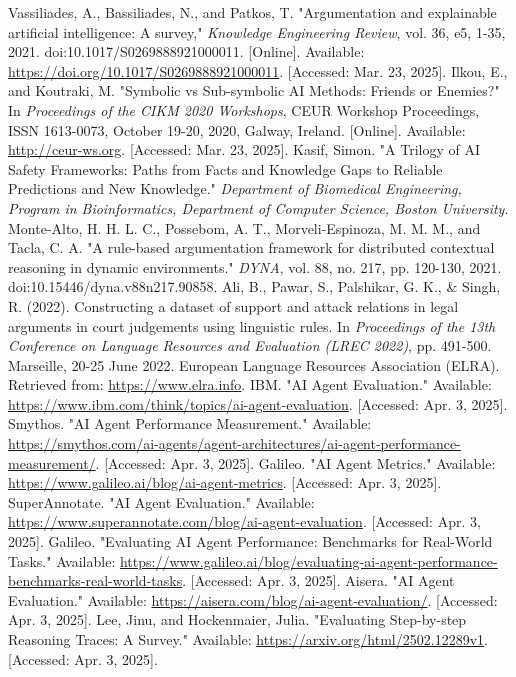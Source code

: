 \documentclass[conference]{IEEEtran}
\begin{document}
\begin{thebibliography}{00}
     Vassiliades, A., Bassiliades, N., and Patkos, T. "Argumentation and explainable artificial intelligence: A survey," \textit{Knowledge Engineering Review}, vol. 36, e5, 1-35, 2021. doi:10.1017/S0269888921000011. [Online]. Available: \url{https://doi.org/10.1017/S0269888921000011}. [Accessed: Mar. 23, 2025].
     Ilkou, E., and Koutraki, M. "Symbolic vs Sub-symbolic AI Methods: Friends or Enemies?" In \textit{Proceedings of the CIKM 2020 Workshops}, CEUR Workshop Proceedings, ISSN 1613-0073, October 19-20, 2020, Galway, Ireland. [Online]. Available: \url{http://ceur-ws.org}. [Accessed: Mar. 23, 2025].
     Kasif, Simon. "A Trilogy of AI Safety Frameworks: Paths from Facts and Knowledge Gaps to Reliable Predictions and New Knowledge." \textit{Department of Biomedical Engineering, Program in Bioinformatics, Department of Computer Science, Boston University}.
     Monte-Alto, H. H. L. C., Possebom, A. T., Morveli-Espinoza, M. M. M., and Tacla, C. A. "A rule-based argumentation framework for distributed contextual reasoning in dynamic environments." \textit{DYNA}, vol. 88, no. 217, pp. 120-130, 2021. doi:10.15446/dyna.v88n217.90858.
     Ali, B., Pawar, S., Palshikar, G. K., \& Singh, R. (2022). Constructing a dataset of support and attack relations in legal arguments in court judgements using linguistic rules. In \textit{Proceedings of the 13th Conference on Language Resources and Evaluation (LREC 2022)}, pp. 491-500. Marseille, 20-25 June 2022. European Language Resources Association (ELRA). Retrieved from: \url{https://www.elra.info}.
     IBM. "AI Agent Evaluation." Available: \url{https://www.ibm.com/think/topics/ai-agent-evaluation}. [Accessed: Apr. 3, 2025].
     Smythos. "AI Agent Performance Measurement." Available: \url{https://smythos.com/ai-agents/agent-architectures/ai-agent-performance-measurement/}. [Accessed: Apr. 3, 2025].
     Galileo. "AI Agent Metrics." Available: \url{https://www.galileo.ai/blog/ai-agent-metrics}. [Accessed: Apr. 3, 2025].
     SuperAnnotate. "AI Agent Evaluation." Available: \url{https://www.superannotate.com/blog/ai-agent-evaluation}. [Accessed: Apr. 3, 2025].
     Galileo. "Evaluating AI Agent Performance: Benchmarks for Real-World Tasks." Available: \url{https://www.galileo.ai/blog/evaluating-ai-agent-performance-benchmarks-real-world-tasks}. [Accessed: Apr. 3, 2025].
     Aisera. "AI Agent Evaluation." Available: \url{https://aisera.com/blog/ai-agent-evaluation/}. [Accessed: Apr. 3, 2025].
     Lee, Jinu, and Hockenmaier, Julia. "Evaluating Step-by-step Reasoning Traces: A Survey." Available: \url{https://arxiv.org/html/2502.12289v1}. [Accessed: Apr. 3, 2025].
\end{thebibliography}
    
\end{document}
